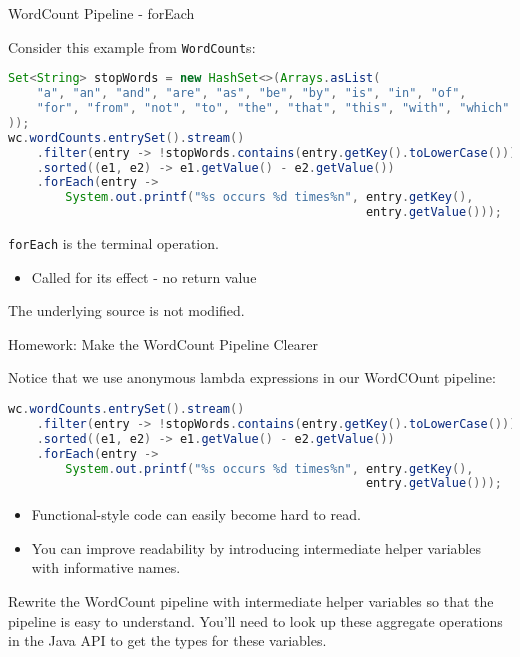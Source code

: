 \documentclass{beamer}
\begin{document}
\begin{frame}[fragile]{WordCount Pipeline - forEach}

Consider this example from {\tt WordCount}s:
\begin{lstlisting}[language=Java]
Set<String> stopWords = new HashSet<>(Arrays.asList(
    "a", "an", "and", "are", "as", "be", "by", "is", "in", "of",
    "for", "from", "not", "to", "the", "that", "this", "with", "which"
));
wc.wordCounts.entrySet().stream()
    .filter(entry -> !stopWords.contains(entry.getKey().toLowerCase()))
    .sorted((e1, e2) -> e1.getValue() - e2.getValue())
    .forEach(entry ->
        System.out.printf("%s occurs %d times%n", entry.getKey(),
                                                  entry.getValue()));
\end{lstlisting}

{\tt forEach} is the terminal operation.
\begin{itemize}
\item Called for its effect - no return value
\end{itemize}

The underlying source is not modified.

\end{frame}


\begin{frame}[fragile]{Homework: Make the WordCount Pipeline Clearer}

Notice that we use anonymous lambda expressions in our WordCOunt pipeline:
\begin{lstlisting}[language=Java]
wc.wordCounts.entrySet().stream()
    .filter(entry -> !stopWords.contains(entry.getKey().toLowerCase()))
    .sorted((e1, e2) -> e1.getValue() - e2.getValue())
    .forEach(entry ->
        System.out.printf("%s occurs %d times%n", entry.getKey(),
                                                  entry.getValue()));
\end{lstlisting}

\begin{itemize}
\item Functional-style code can easily become hard to read.
\item You can improve readability by introducing intermediate helper variables with informative names.
\end{itemize}
Rewrite the WordCount pipeline with intermediate helper variables so that the pipeline is easy to understand.  You'll need to look up these aggregate operations in the Java API to get the types for these variables.

\end{frame}
\end{document}
